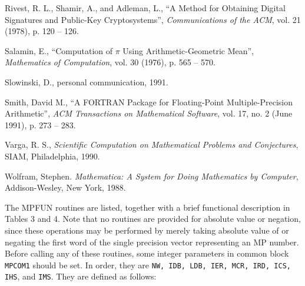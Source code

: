 \begin{thebibliography}{25}
 Rivest, R. L., Shamir, A., and Adleman, L., ``A Method
for Obtaining Digital Signatures and Public-Key Cryptosystems'', {\sl
Communications of the ACM}, vol. 21 (1978), p.  120 -- 126.

 Salamin, E., ``Computation of $\pi$ Using
Arithmetic-Geometric Mean'', {\sl Mathematics of Computation}, vol. 30
(1976), p. 565 -- 570.

 Slowinski, D., personal communication, 1991.

 Smith, David M., ``A FORTRAN Package for
Floating-Point Multiple-Precision Arithmetic'', {\sl ACM Transactions
on Mathematical Software}, vol. 17, no. 2 (June 1991), p. 273 -- 283.

 Varga, R. S., {\sl Scientific Computation on
Mathematical Problems and Conjectures}, SIAM, Philadelphia, 1990.

 Wolfram, Stephen. {\sl Mathematica: A System for
Doing Mathematics by Computer}, Addison-Wesley, New York, 1988.

\end{thebibliography}

\newpage


The MPFUN routines are listed, together with a brief functional
description in Tables 3 and 4.  Note that no routines are provided for
absolute value or negation, since these operations may be performed by
merely taking absolute value of or negating the first word of the
single precision vector representing an MP number.  Before calling any
of these routines, some integer parameters in common block {\tt
MPCOM1} should be set.  In order, they are {\tt NW, IDB, LDB, IER,
MCR, IRD, ICS, IHS}, and {\tt IMS}.  They are defined as follows:

